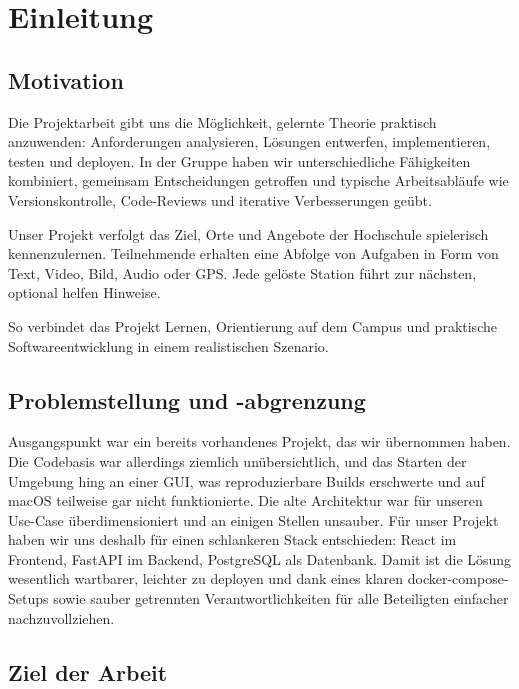 \documentclass[oneside]{ausarbeitung}
\begin{document}
\chapter{Einleitung}
\label{cha:einleitung}


\section{Motivation}
\label{sec:motivation}

Die Projektarbeit gibt uns die Möglichkeit, gelernte Theorie praktisch anzuwenden: Anforderungen analysieren, Lösungen entwerfen, implementieren, testen und deployen. In der Gruppe haben wir unterschiedliche Fähigkeiten kombiniert, gemeinsam Entscheidungen getroffen und typische Arbeitsabläufe wie Versionskontrolle, Code-Reviews und iterative Verbesserungen geübt.

Unser Projekt verfolgt das Ziel, Orte und Angebote der Hochschule spielerisch kennenzulernen. Teilnehmende erhalten eine Abfolge von Aufgaben in Form von Text, Video, Bild, Audio oder GPS. Jede gelöste Station führt zur nächsten, optional helfen Hinweise. 

So verbindet das Projekt Lernen, Orientierung auf dem Campus und praktische Softwareentwicklung in einem realistischen Szenario.

\section{Problemstellung und -abgrenzung}
\label{sec:problemstellung}

Ausgangspunkt war ein bereits vorhandenes Projekt, das wir übernommen haben. Die Codebasis war allerdings ziemlich unübersichtlich, und das Starten der Umgebung hing an einer GUI, was reproduzierbare Builds erschwerte und auf macOS teilweise gar nicht funktionierte. Die alte Architektur war für unseren Use-Case überdimensioniert und an einigen Stellen unsauber. Für unser Projekt haben wir uns deshalb für einen schlankeren Stack entschieden: React im Frontend, FastAPI im Backend, PostgreSQL als Datenbank. Damit ist die Lösung wesentlich wartbarer, leichter zu deployen und dank eines klaren docker-compose-Setups sowie sauber getrennten Verantwortlichkeiten für alle Beteiligten einfacher nachzuvollziehen.

\section{Ziel der Arbeit}
\label{sec:ziel}
\end{document}
